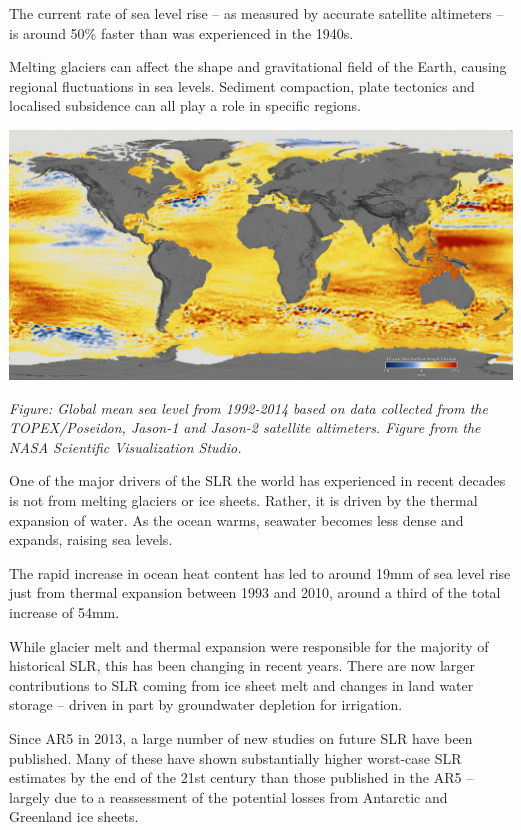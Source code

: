 \documentclass[
]{book}
\begin{document}
The current rate of sea level rise -- as measured by accurate satellite altimeters -- is around 50\% faster than was experienced in the 1940s.

Melting glaciers can affect the shape and gravitational field of the Earth, causing regional fluctuations in sea levels. Sediment compaction, plate tectonics and localised subsidence can all play a role in specific regions.

\includegraphics{fig/sea_level_rise.jpg}

\emph{Figure: Global mean sea level from 1992-2014 based on data collected from the TOPEX/Poseidon, Jason-1 and Jason-2 satellite altimeters. Figure from the NASA Scientific Visualization Studio.}

One of the major drivers of the SLR the world has experienced in recent decades is not from melting glaciers or ice sheets. Rather, it is driven by the thermal expansion of water. As the ocean warms, seawater becomes less dense and expands, raising sea levels.

The rapid increase in ocean heat content has led to around 19mm of sea level rise just from thermal expansion between 1993 and 2010, around a third of the total increase of 54mm.

While glacier melt and thermal expansion were responsible for the majority of historical SLR, this has been changing in recent years. There are now larger contributions to SLR coming from ice sheet melt and changes in land water storage -- driven in part by groundwater depletion for irrigation.

Since AR5 in 2013, a large number of new studies on future SLR have been published. Many of these have shown substantially higher worst-case SLR estimates by the end of the 21st century than those published in the AR5 -- largely due to a reassessment of the potential losses from Antarctic and Greenland ice sheets.
\end{document}
